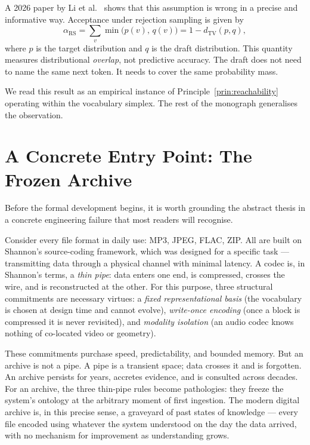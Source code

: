 \documentclass[11pt, a4paper, openany]{book}
\theoremstyle{plain}
\theoremstyle{definition}
\theoremstyle{remark}
\newcommand{\TV}{d_{\mathrm{TV}}}
\newcommand{\RS}{\alpha_{\mathrm{RS}}}
\begin{document}
A 2026 paper by Li et al.\ \cite{li2026breaking} shows that this assumption
is wrong in a precise and informative way.
Acceptance under rejection sampling is given by
\[
  \RS = \sum_v \min\!\bigl(p(v),\, q(v)\bigr) = 1 - \TV(p, q),
\]
where $p$ is the target distribution and $q$ is the draft distribution.
This quantity measures distributional \emph{overlap}, not predictive accuracy.
The draft does not need to name the same next token.
It needs to cover the same probability mass.

We read this result as an empirical instance of Principle~\ref{prin:reachability}
operating within the vocabulary simplex.
The rest of the monograph generalises the observation.

\section{A Concrete Entry Point: The Frozen Archive}

Before the formal development begins, it is worth grounding the abstract
thesis in a concrete engineering failure that most readers will recognise.

Consider every file format in daily use: MP3, JPEG, FLAC, ZIP.
All are built on Shannon's source-coding framework, which was designed for
a specific task --- transmitting data through a physical channel with
minimal latency.
A codec is, in Shannon's terms, a \emph{thin pipe}: data enters one end,
is compressed, crosses the wire, and is reconstructed at the other.
For this purpose, three structural commitments are necessary virtues:
a \emph{fixed representational basis} (the vocabulary is chosen at design
time and cannot evolve), \emph{write-once encoding} (once a block is
compressed it is never revisited), and \emph{modality isolation}
(an audio codec knows nothing of co-located video or geometry).

These commitments purchase speed, predictability, and bounded memory.
But an archive is not a pipe.
A pipe is a transient space; data crosses it and is forgotten.
An archive persists for years, accretes evidence, and is consulted across decades.
For an archive, the three thin-pipe rules become pathologies:
they freeze the system's ontology at the arbitrary moment of first ingestion.
The modern digital archive is, in this precise sense, a graveyard of past
states of knowledge --- every file encoded using whatever the system understood
on the day the data arrived, with no mechanism for improvement as understanding grows.
\end{document}
